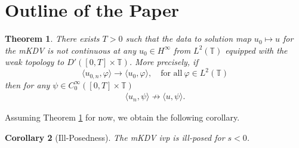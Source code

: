 \documentclass[12pt,reqno]{amsart}
\numberwithin{equation}{section}  %
\newcommand{\ci}{\mathbb{T}}
\newcommand{\vp}{\varphi}
\newtheorem{theorem}{Theorem}[section]
\newtheorem{corollary}[theorem]{Corollary}
\begin{document}
  \section{Outline of the Paper}
        \label{sec:outline}
        \begin{theorem}
          \label{thm:cont-fail}
        There exists $T > 0$ such that the data to solution map $u_{0} \mapsto u$ for
        the mKDV is not continuous at any $u_{0} \in H^{\infty}$ from $L^{2}(\ci)$
        equipped with the weak topology to $D'\left([0, T] \times \ci
        \right)$. More precisely, if 
        \begin{equation}
          \langle u_{0,n}, \vp \rangle  \to \langle u_{0}, \vp \rangle , \quad
          \text{for all} \ \vp \in L^{2}(\ci)
        \end{equation}
        then for any 
        $\psi \in C_{0}^{\infty}([0, T] \times \ci)$ 
        \begin{equation*}
        \begin{split}
          \langle u_{n}, \psi \rangle  \not \to \langle u, \psi \rangle. 
        \end{split}
        \end{equation*}
        \end{theorem}
    Assuming Theorem \ref{thm:cont-fail} for now, we obtain the following
    corollary.
    \begin{corollary}[Ill-Posedness]
   The mKDV ivp is ill-posed for $s < 0$.  
    \label{prop:ill-pos}
    \end{corollary}
\end{document}
